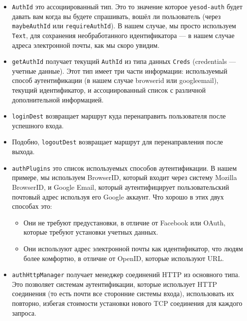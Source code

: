 \begin{itemize}
    \item \lstinline'AuthId' это ассоциированный тип. Это то значение которое \lstinline'yesod-auth' будет давать вам когда вы будете спрашивать, вошёл ли пользователь (через \lstinline'maybeAuthId' или \lstinline'requireAuthId'). В нашем случае, мы просто используем \lstinline'Text', для сохранения необработанного идентификатора --- в нашем случае адреса электронной почты, как мы скоро увидим. 

    \item \lstinline'getAuthId' получает текущий \lstinline'AuthId' из типа данных \lstinline'Creds' (credentials --- учетные данные). Этот тип имеет три части информации: используемый способ аутентификации (в нашем случае browserid или googleemail), текущий идентификатор, и ассоциированный список с различной дополнительной информацией.

    \item \lstinline'loginDest' возвращает маршрут куда перенаправить пользователя после успешного входа.

    \item Подобно, \lstinline'logoutDest' возвращает маршрут для перенаправления после выхода. 

    \item \lstinline'authPlugins' это список используемых способов аутентификации. В нашем примере, мы используем BrowserID, который входит через систему Mozilla BrowserID, и Google Email, который аутентифицирует пользовательский почтовый адрес используя его Google аккаунт. Что хорошо в этих двух способах это:
    
    \begin{itemize}
        \item Они не требуют предустановки, в отличие от Facebook или OAuth, которые требуют установки учетных данных.
        
        \item Они используют адрес электронной почты как идентификатор, что людям более комфортно, в отличие от OpenID, которые используют URL. 
    \end{itemize}
    
    \item \lstinline'authHttpManager' получает менеджер соединений HTTP из основного типа. Это позволяет системам аутентификации, которые использует HTTP соединения (то есть почти все сторонние системы входа), использовать их повторно, избегая стоимости установки нового TCP соединения для каждого запроса.
\end{itemize}


